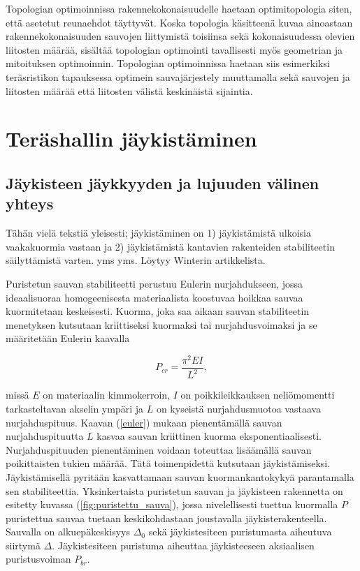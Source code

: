 \documentclass[12pt]{article}
\newenvironment{content}{\pagenumbering{arabic}}{}
\begin{document}
\begin{content}
Topologian optimoinnissa rakennekokonaisuudelle haetaan optimitopologia siten, että asetetut reunaehdot täyttyvät. Koska topologia käsitteenä kuvaa ainoastaan rakennekokonaisuuden sauvojen liittymistä toisiinsa sekä kokonaisuudessa olevien liitosten määrää, sisältää topologian optimointi tavallisesti myös geometrian ja mitoituksen optimoinnin. Topologian optimoinnissa haetaan siis esimerkiksi teräsristikon tapauksessa optimein sauvajärjestely muuttamalla sekä sauvojen ja liitosten määrää että liitosten välistä keskinäistä sijaintia. 






\section{Teräshallin jäykistäminen}


\subsection{Jäykisteen jäykkyyden ja lujuuden välinen yhteys}
Tähän vielä tekstiä yleisesti; jäykistäminen on 1) jäykistämistä ulkoisia vaakakuormia vastaan ja 2) jäykistämistä kantavien rakenteiden stabiliteetin säilyttämistä varten. yms yms. Löytyy Winterin artikkelista. 

Puristetun sauvan stabiliteetti perustuu Eulerin nurjahdukseen, jossa ideaalisuoraa homogeenisesta materiaalista koostuvaa hoikkaa sauvaa kuormitetaan keskeisesti. Kuorma, joka saa aikaan sauvan stabiliteetin menetyksen kutsutaan kriittiseksi kuormaksi tai nurjahdusvoimaksi ja se määritetään Eulerin kaavalla

\begin{equation}
\label{euler}
P_{cr} = \frac{\pi^2 E I}{L^2},
\end{equation}

missä $E$ on materiaalin kimmokerroin, $I$ on poikkileikkauksen neliömomentti tarkasteltavan akselin ympäri ja $L$ on kyseistä nurjahdusmuotoa vastaava nurjahduspituus. Kaavan (\ref{euler}) mukaan pienentämällä sauvan nurjahduspituutta $L$ kasvaa sauvan kriittinen kuorma eksponentiaalisesti. Nurjahduspituuden pienentäminen voidaan toteuttaa lisäämällä sauvan poikittaisten tukien määrää. Tätä toimenpidettä kutsutaan jäykistämiseksi. Jäykistämisellä pyritään kasvattamaan sauvan kuormankantokykyä parantamalla sen stabiliteettia. Yksinkertaista puristetun sauvan ja jäykisteen rakennetta on esitetty kuvassa (\ref{fig:puristettu_sauva}), jossa nivelellisesti tuettua kuormalla $P$ puristettua sauvaa tuetaan keskikohdastaan joustavalla jäykisterakenteella. Sauvalla on alkuepäkeskisyys $\Delta_0$ sekä jäykistesiteen puristumasta aiheutuva siirtymä $\Delta$. Jäykistesiteen puristuma aiheuttaa jäykisteeseen aksiaalisen puristusvoiman $P_{br}$.


\end{content}
\end{document}
